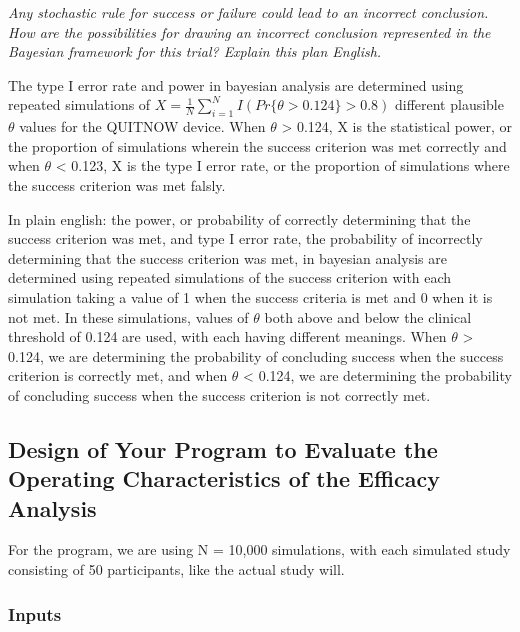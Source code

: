 \documentclass[
]{article}
\begin{document}
\emph{Any stochastic rule for success or failure could lead to an
incorrect conclusion. How are the possibilities for drawing an incorrect
conclusion represented in the Bayesian framework for this trial? Explain
this plan English.}

The type I error rate and power in bayesian analysis are determined
using repeated simulations of
\(X = \frac{1}{N} \sum_{i=1}^N I (Pr\{\theta> 0.124\} > 0.8)\) different
plausible \(\theta\) values for the QUITNOW device. When \(\theta\)
\textgreater{} 0.124, X is the statistical power, or the proportion of
simulations wherein the success criterion was met correctly and when
\(\theta\) \textless{} 0.123, X is the type I error rate, or the
proportion of simulations where the success criterion was met falsly.

In plain english: the power, or probability of correctly determining
that the success criterion was met, and type I error rate, the
probability of incorrectly determining that the success criterion was
met, in bayesian analysis are determined using repeated simulations of
the success criterion with each simulation taking a value of 1 when the
success criteria is met and 0 when it is not met. In these simulations,
values of \(\theta\) both above and below the clinical threshold of
0.124 are used, with each having different meanings. When \(\theta\)
\textgreater{} 0.124, we are determining the probability of concluding
success when the success criterion is correctly met, and when \(\theta\)
\textless{} 0.124, we are determining the probability of concluding
success when the success criterion is not correctly met.

\hypertarget{design-of-your-program-to-evaluate-the-operating-characteristics-of-the-efficacy-analysis}{%
\subsection{Design of Your Program to Evaluate the Operating
Characteristics of the Efficacy
Analysis}\label{design-of-your-program-to-evaluate-the-operating-characteristics-of-the-efficacy-analysis}}

For the program, we are using N = 10,000 simulations, with each
simulated study consisting of 50 participants, like the actual study
will.

\hypertarget{inputs}{%
\subsubsection{Inputs}\label{inputs}}
\end{document}
